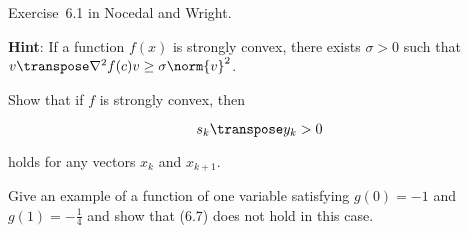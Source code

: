 \begin{problem}\label{prob:01}%
  Exercise~6.1 in Nocedal and Wright. 
  
  
  
  \textbf{Hint}: \textnormal{If a function $f(x)$ is strongly convex, there exists $\sigma > 0$ such that $v\transpose \nabla^{2}f(c) v \geq \sigma \norm{v}^2$.}
\end{problem}

\begin{subproblem}
  Show that if $f$ is strongly convex, then
  
  \[ s_{k}\transpose y_k > 0 \]

  \vspace{-1em}
  holds for any vectors $x_k$ and $x_{k+1}$.
\end{subproblem}

\begin{subproblem}
  Give an example of a function of one variable satisfying $g(0)=-1$ and $g(1)=-\frac{1}{4}$ and show that (6.7) does not hold in this case.
\end{subproblem}

